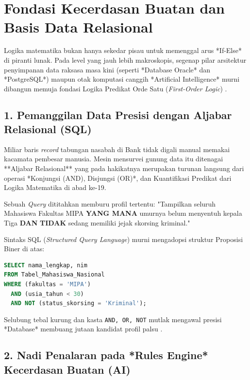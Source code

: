 \section{Fondasi Kecerdasan Buatan dan Basis Data Relasional}

Logika matematika bukan hanya sekedar pisau untuk memenggal arus *If-Else* di piranti lunak. Pada level yang jauh lebih makroskopis, segenap pilar arsitektur penyimpanan data raksasa masa kini (seperti *Database Oracle* dan *PostgreSQL*) maupun otak komputasi canggih *Artificial Intelligence* murni dibangun memuja fondasi Logika Predikat Orde Satu (\textit{First-Order Logic}) \cite{mit_6042,rosen2019}.

\subsection{1. Pemanggilan Data Presisi dengan Aljabar Relasional (SQL)}

Miliar baris \textit{record} tabungan nasabah di Bank tidak digali manual memakai kacamata pembesar manusia. Mesin mensurvei gunung data itu ditenagai **Aljabar Relasional** yang pada hakikatnya merupakan turunan langsung dari operasi *Konjungsi (AND), Disjungsi (OR)*, dan Kuantifikasi Predikat dari Logika Matematika di abad ke-19.

\begin{contoh}
Sebuah \textit{Query} dititahkan memburu profil tertentu: "Tampilkan seluruh Mahasiswa Fakultas MIPA \textbf{YANG MANA} umurnya belum menyentuh kepala Tiga \textbf{DAN} \textbf{TIDAK} sedang memiliki jejak skorsing kriminal."

Sintaks SQL (\textit{Structured Query Language}) murni mengadopsi struktur Proposisi Biner di atas:
\begin{lstlisting}[language=SQL, basicstyle=\ttfamily\small, frame=single, caption={Analisis Klausa \texttt{WHERE} dengan ikatan Logika Boolean Raksasa}]
SELECT nama_lengkap, nim 
FROM Tabel_Mahasiswa_Nasional
WHERE (fakultas = 'MIPA') 
  AND (usia_tahun < 30) 
  AND NOT (status_skorsing = 'Kriminal');
\end{lstlisting}
Selubung tebal kurung dan kasta \texttt{AND, OR, NOT} mutlak mengawal presisi *Database* membuang jutaan kandidat profil palsu \cite{rosen2019}.
\end{contoh}

\subsection{2. Nadi Penalaran pada *Rules Engine* Kecerdasan Buatan (AI)}

